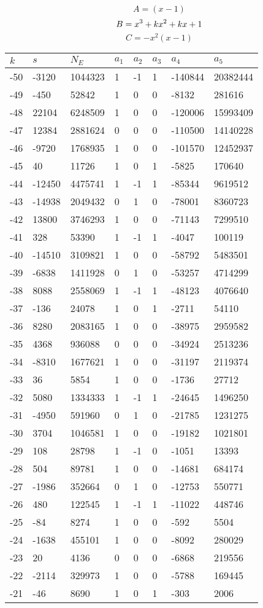 \documentclass{amsart}
\begin{document}
$$A=(x
 - 1)$$
$$B=x^3
 + k\*x^2
 + k\*x
 + 1$$
$$C=-x^2(x
 - 1)$$
\begin{longtable}{|l|l|l|lllll|}
\hline
$k$ & $s$ & $N_E$ & $a_1$ & $a_2$ & $a_3$ & $a_4$ & $a_5$\\
\hline
-50&-3120&1044323&1&-1&1&-140844&20382444\\
-49&-450&52842&1&0&0&-8132&281616\\
-48&22104&6248509&1&0&0&-120006&15993409\\
-47&12384&2881624&0&0&0&-110500&14140228\\
-46&-9720&1768935&1&0&0&-101570&12452937\\
-45&40&11726&1&0&1&-5825&170640\\
-44&-12450&4475741&1&-1&1&-85344&9619512\\
-43&-14938&2049432&0&1&0&-78001&8360723\\
-42&13800&3746293&1&0&0&-71143&7299510\\
-41&328&53390&1&-1&1&-4047&100119\\
-40&-14510&3109821&1&0&0&-58792&5483501\\
-39&-6838&1411928&0&1&0&-53257&4714299\\
-38&8088&2558069&1&-1&1&-48123&4076640\\
-37&-136&24078&1&0&1&-2711&54110\\
-36&8280&2083165&1&0&0&-38975&2959582\\
-35&4368&936088&0&0&0&-34924&2513236\\
-34&-8310&1677621&1&0&0&-31197&2119374\\
-33&36&5854&1&0&0&-1736&27712\\
-32&5080&1334333&1&-1&1&-24645&1496250\\
-31&-4950&591960&0&1&0&-21785&1231275\\
-30&3704&1046581&1&0&0&-19182&1021801\\
-29&108&28798&1&-1&0&-1051&13393\\
-28&504&89781&1&0&0&-14681&684174\\
-27&-1986&352664&0&1&0&-12753&550771\\
-26&480&122545&1&-1&1&-11022&448746\\
-25&-84&8274&1&0&0&-592&5504\\
-24&-1638&455101&1&0&0&-8092&280029\\
-23&20&4136&0&0&0&-6868&219556\\
-22&-2114&329973&1&0&0&-5788&169445\\
-21&-46&8690&1&0&1&-303&2006\\

\end{longtable}
\end{document}
